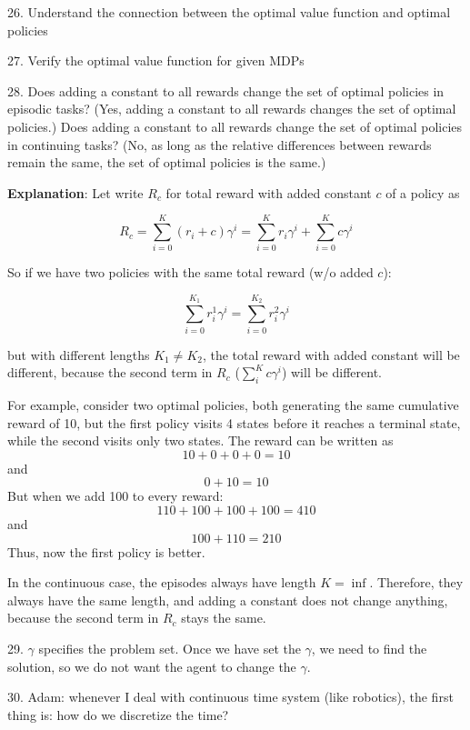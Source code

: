 \documentclass[sutton_barto_notes.tex]{subfiles}
\begin{document}
26. Understand the connection between the optimal value function and optimal policies

27. Verify the optimal value function for given MDPs

28. Does adding a constant to all rewards change the set of optimal policies in episodic tasks? (Yes, adding a constant to all rewards changes the set of optimal policies.)
Does adding a constant to all rewards change the set of optimal policies in continuing tasks? (No, as long as the relative differences between rewards remain the same, the set of optimal policies is the same.)

\textbf{Explanation}: Let write $R_c$ for total reward with added constant $c$ of a policy as

$$ R_c = \sum_{i=0}^K (r_i + c) \gamma^i = \sum_{i=0}^K r_i \gamma^i + \sum_{i=0}^K c \gamma^i $$

So if we have two policies with the same total reward (w/o added $c$):

$$ \sum_{i=0}^{K_1} r_i^1\gamma^i = \sum_{i=0}^{K_2} r_i^2 \gamma^i $$

but with different lengths $K_1 \neq K_2$, the total reward with added constant will be different, because the second term in $R_c$ ($\sum_i^K c\gamma^i$) will be different.

For example, consider two optimal policies, both generating the same cumulative reward of 10, but the first policy visits 4 states before it reaches a terminal state, while the second visits only two states. The reward can be written as
$$ 10 + 0 + 0 + 0 = 10 $$
and
$$0+10=10$$
But when we add 100 to every reward:
$$ 110+100+100+100=410$$
and
$$100+110=210$$
Thus, now the first policy is better.

In the continuous case, the episodes always have length $K=\inf$. Therefore, they always have the same length, and adding a constant does not change anything, because the second term in $R_c$ stays the same.

29. $\gamma$ specifies the problem set. Once we have set the $\gamma$, we need to find the solution, so we do not want the agent to change the $\gamma$.

30. Adam: whenever I deal with continuous time system (like robotics), the first thing is: how do we discretize the time?
\end{document}
